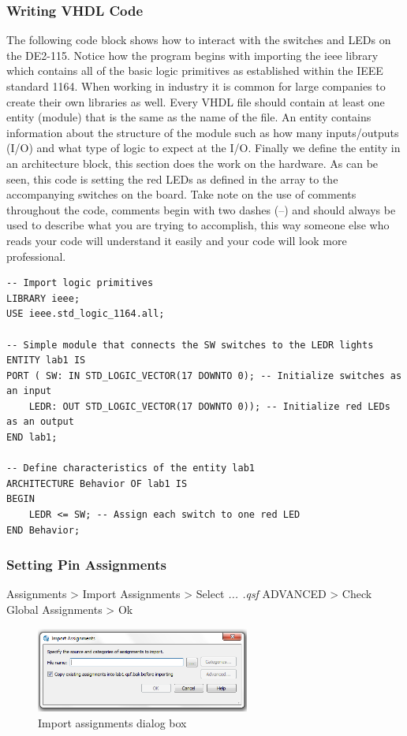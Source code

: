\subsubsection{Writing VHDL Code}

The following code block shows how to interact with the switches and LEDs on the DE2-115. Notice how the program begins with importing the ieee library which contains all of the basic logic primitives as established within the IEEE standard 1164. When working in industry it is common for large companies to create their own libraries as well. Every VHDL file should contain at least one entity (module) that is the same as the name of the file. An entity contains information about the structure of the module such as how many inputs/outputs (I/O) and what type of logic to expect at the I/O. Finally we define the entity in an architecture block, this section does the work on the hardware. As can be seen, this code is setting the red LEDs as defined in the array to the accompanying switches on the board. Take note on the use of comments throughout the code, comments begin with two dashes (--) and should always be used to describe what you are trying to accomplish, this way someone else who reads your code will understand it easily and your code will look more professional. 

\begin{lstlisting}
-- Import logic primitives
LIBRARY ieee;
USE ieee.std_logic_1164.all;

-- Simple module that connects the SW switches to the LEDR lights
ENTITY lab1 IS
PORT ( SW: IN STD_LOGIC_VECTOR(17 DOWNTO 0); -- Initialize switches as an input
	LEDR: OUT STD_LOGIC_VECTOR(17 DOWNTO 0)); -- Initialize red LEDs as an output
END lab1;

-- Define characteristics of the entity lab1
ARCHITECTURE Behavior OF lab1 IS
BEGIN
	LEDR <= SW; -- Assign each switch to one red LED
END Behavior;
\end{lstlisting}

\subsubsection{Setting Pin Assignments}

Assignments > Import Assignments >  Select \emph{... .qsf} %
ADVANCED > Check Global Assignments > Ok %

\begin{figure}[H]
	\centering
	\includegraphics[width=70mm]{Lab1/figures/importassign.png}
	\caption{Import assignments dialog box}
	\label{fig:importassign}
\end{figure}

